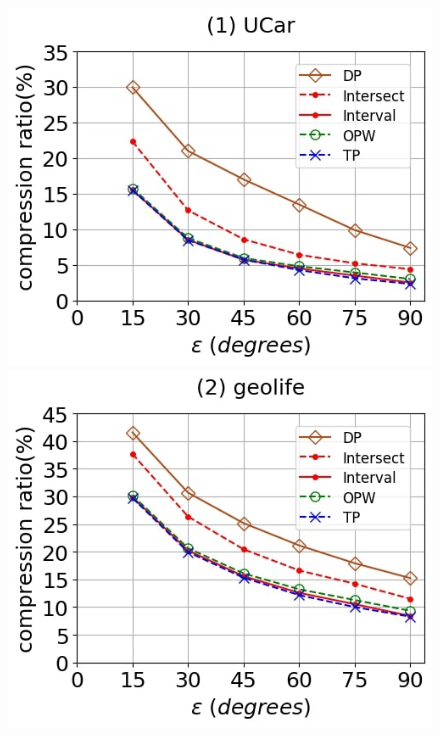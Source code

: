 \begin{figure}[tb!]
	\centering
	\includegraphics[scale=0.250]{Figures/Exp-DAD-CR-epsilon-service.jpg} 	\hspace{0.5ex}
	\includegraphics[scale=0.250]{Figures/Exp-DAD-CR-epsilon-geolife.jpg}	\hspace{0.5ex}

\end{figure}
